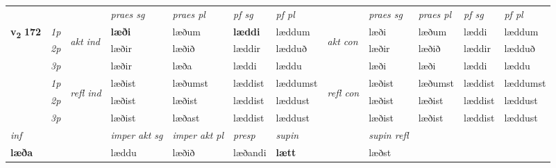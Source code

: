 \begin{longtable}[l]{X>{\footnotesize\itshape}llXXXXlXXXX}
 & &   & \textit{praes sg}  & \textit{praes pl}    & \textit{ pf sg} & \textit{pf pl} & & \textit{praes sg}  & \textit{praes pl}    & \textit{pf sg} & \textit{pf pl }  \\ \cmidrule{4-7} \cmidrule{9-12}
 \multirow{2}{*}{{{\textbf{v{\textsubscript{2}}} \Large{\textbf{172}}}}}  & 1p & \multirow{3}{*}{\begin{turn}{90}\textit{akt ind}\end{turn}} & \textbf{læði} & læðum & \textbf{læddi} & læddum & \multirow{3}{*}{\begin{turn}{90}\textit{akt con}\end{turn}} &læði & læðum & læddi & læddum\\*
 & 2p &  &  læðir  & læðið & læddir & lædduð & & læðir & læðið & læddir & lædduð \\*
 & 3p &  & læðir & læða & læddi & læddu & & læði & læði& læddi & læddu \\*
\cmidrule{4-7} \cmidrule{9-12}
 & 1p & \multirow{3}{*}{\begin{turn}{90}\textit{refl ind}\end{turn}}  & læðist & læðumst & læddist & læddumst & \multirow{3}{*}{\begin{turn}{90}\textit{refl con}\end{turn}}  &læðist & læðumst & læddist & læddumst \\*
 & 2p &  & læðist & læðist & læddist & læddust & &læðist & læðist & læddist & læddust \\*
 & 3p  & & læðist & læðast & læddist & læddust & & læðist & læðist& læddist & læddust \\*
\cmidrule{4-7} \cmidrule{9-12}

   {\textit{inf}} & &  & \textit{imper akt sg} & \textit{imper akt pl}   & \textit{presp} & \textit{supin} && \textit{supin refl}  \\*
  {\textbf{læða}} & && læddu  & læðið   & læðandi &  \textbf{lætt} && læðst  \\*

\midrule


\end{longtable}
